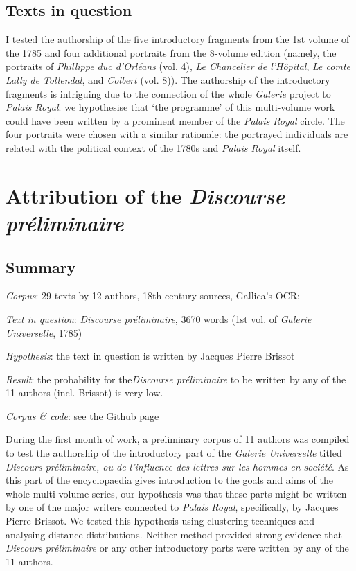 \documentclass[12pt, letterpaper]{article}
\begin{document}
\subsection{Texts in question}
I tested the authorship of the five introductory fragments from the 1st volume of the 1785 and four additional portraits from the 8-volume edition (namely, the portraits of \emph{Phillippe duc d'Orléans} (vol. 4), \emph{Le Chancelier de l'Hôpital}, \emph{Le comte Lally de Tollendal}, and \emph{Colbert} (vol. 8)). The authorship of the introductory fragments is intriguing due to the connection of the whole \emph{Galerie} project to \emph{Palais Royal}: we hypothesise that `the programme' of this multi-volume work could have been written by a prominent member of the \emph{Palais Royal} circle. The four portraits were chosen with a similar rationale: the portrayed individuals are related with the political context of the 1780s and \emph{Palais Royal} itself.

\section{Attribution of the \emph{Discourse préliminaire}}
\subsection{Summary}
\emph{Corpus}: 29 texts by 12 authors, 18th-century sources, Gallica's OCR;

\emph{Text in question}: \emph{Discourse préliminaire}, 3670 words (1st vol. of \emph{Galerie Universelle}, 1785)

\emph{Hypothesis}: the text in question is written by Jacques Pierre Brissot

\emph{Result}: the probability for the\emph{Discourse préliminaire} to be written by any of the 11 authors (incl. Brissot) is very low.

\emph{Corpus \& code}: see the \href{https://github.com/tonyamart/fr_pamphlets/tree/main/experiment_galerie_1}{Github page}

During the first month of work, a preliminary corpus of 11 authors was compiled to test the authorship of the introductory part of the \emph{Galerie Universelle} titled \emph{Discours préliminaire, ou de l'influence des lettres sur les hommes en société}. As this part of the encyclopaedia gives introduction to the goals and aims of the whole multi-volume series, our hypothesis was that these parts might be written by one of the major writers connected to \emph{Palais Royal}, specifically, by Jacques Pierre Brissot. We tested this hypothesis using clustering techniques and analysing distance distributions. Neither method provided strong evidence that \emph{Discours préliminaire} or any other introductory parts were written by any of the 11 authors.
\end{document}
